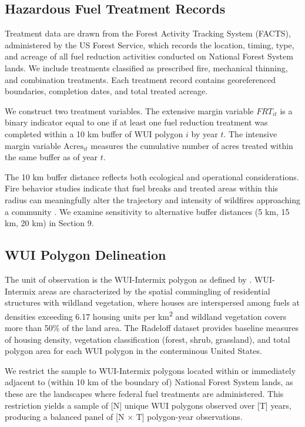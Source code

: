 \documentclass[12pt, letterpaper]{article}
\begin{document}
\subsection{Hazardous Fuel Treatment Records}

Treatment data are drawn from the Forest Activity Tracking System (FACTS), administered by the US Forest Service, which records the location, timing, type, and acreage of all fuel reduction activities conducted on National Forest System lands. We include treatments classified as prescribed fire, mechanical thinning, and combination treatments. Each treatment record contains georeferenced boundaries, completion dates, and total treated acreage.

We construct two treatment variables. The extensive margin variable $FRT_{it}$ is a binary indicator equal to one if at least one fuel reduction treatment was completed within a 10 km buffer of WUI polygon $i$ by year $t$. The intensive margin variable $\text{Acres}_{it}$ measures the cumulative number of acres treated within the same buffer as of year $t$.

The 10 km buffer distance reflects both ecological and operational considerations. Fire behavior studies indicate that fuel breaks and treated areas within this radius can meaningfully alter the trajectory and intensity of wildfires approaching a community \citep{finney2001}. We examine sensitivity to alternative buffer distances (5 km, 15 km, 20 km) in Section 9.

\subsection{WUI Polygon Delineation}

The unit of observation is the WUI-Intermix polygon as defined by \citet{radeloff2018}. WUI-Intermix areas are characterized by the spatial commingling of residential structures with wildland vegetation, where houses are interspersed among fuels at densities exceeding 6.17 housing units per km\textsuperscript{2} and wildland vegetation covers more than 50\% of the land area. The Radeloff dataset provides baseline measures of housing density, vegetation classification (forest, shrub, grassland), and total polygon area for each WUI polygon in the conterminous United States.

We restrict the sample to WUI-Intermix polygons located within or immediately adjacent to (within 10 km of the boundary of) National Forest System lands, as these are the landscapes where federal fuel treatments are administered. This restriction yields a sample of [N] unique WUI polygons observed over [T] years, producing a balanced panel of [N $\times$ T] polygon-year observations.
\end{document}
